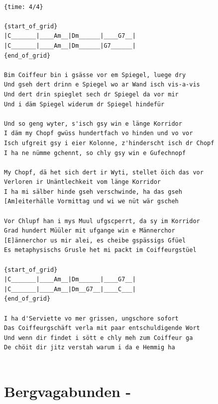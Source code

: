 \documentclass[
]{book}
\let\stdsection\section
\renewcommand\section{\clearpage\stdsection}
\begin{document}
\begin{verbatim}

{time: 4/4}

{start_of_grid}
|C_______|____Am__|Dm______|____G7__|
|C_______|____Am__|Dm______|G7______|
{end_of_grid}

Bim Coiffeur bin i gsässe vor em Spiegel, luege dry
Und gseh dert drinn e Spiegel wo ar Wand isch vis-a-vis
Und dert drin spieglet sech dr Spiegel da vor mir
Und i däm Spiegel widerum dr Spiegel hindefür

Und so geng wyter, s'isch gsy win e länge Korridor
I däm my Chopf gwüss hundertfach vo hinden und vo vor
Isch ufgreit gsy i eier Kolonne, z'hinderscht isch dr Chopf
I ha ne nümme gchennt, so chly gsy win e Gufechnopf

My Chopf, dä het sich dert ir Wyti, stellet öich das vor
Verloren ir Unäntlechkeit vom länge Korridor
I ha mi sälber hinde gseh verschwinde, ha das gseh
[Am]eiterhälle Vormittag und wi we nüt wär gscheh

Vor Chlupf han i mys Muul ufgscperrt, da sy im Korridor
Grad hundert Müüler mit ufgange win e Männerchor
[E]ännerchor us mir alei, es cheibe gspässigs Gfüel
Es metaphysischs Grusle het mi packt im Coiffeurgstüel

{start_of_grid}
|C_______|____Am__|Dm______|____G7__|
|C_______|____Am__|Dm__G7__|____C___| 
{end_of_grid}

I ha d'Serviette vo mer grissen, ungschore sofort
Das Coiffeurgschäft verla mit paar entschuldigende Wort
Und wenn dir findet i sött e chly meh zum Coiffeur ga
De chöit dir jitz verstah warum i da e Hemmig ha


\end{verbatim}

\hypertarget{bergvagabunden--}{%
\section{Bergvagabunden -}\label{bergvagabunden--}}
\end{document}
